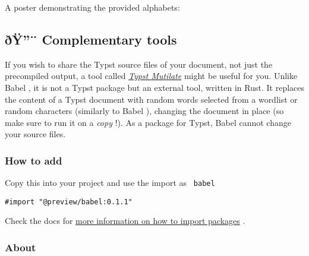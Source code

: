 A poster demonstrating the provided alphabets:

\href{https://github.com/typst/packages/raw/main/packages/preview/babel/0.1.1/assets/poster.webp}{}

\subsection{ðŸ''¨ Complementary
tools}\label{uxf0uxff-complementary-tools}

If you wish to share the Typst source files of your document, not just
the precompiled output, a tool called
\href{https://github.com/frozolotl/typst-mutilate}{\emph{Typst
Mutilate}} might be useful for you. Unlike { Babel } , it is not a Typst
package but an external tool, written in Rust. It replaces the content
of a Typst document with random words selected from a wordlist or random
characters (similarly to { Babel } ), changing the document in place (so
make sure to run it on a \emph{copy} !). As a package for Typst, { Babel
} cannot change your source files.

\subsubsection{How to add}\label{how-to-add}

Copy this into your project and use the import as \texttt{\ babel\ }

\begin{verbatim}
#import "@preview/babel:0.1.1"
\end{verbatim}



Check the docs for
\href{https://typst.app/docs/reference/scripting/\#packages}{more
information on how to import packages} .

\subsubsection{About}\label{about}

